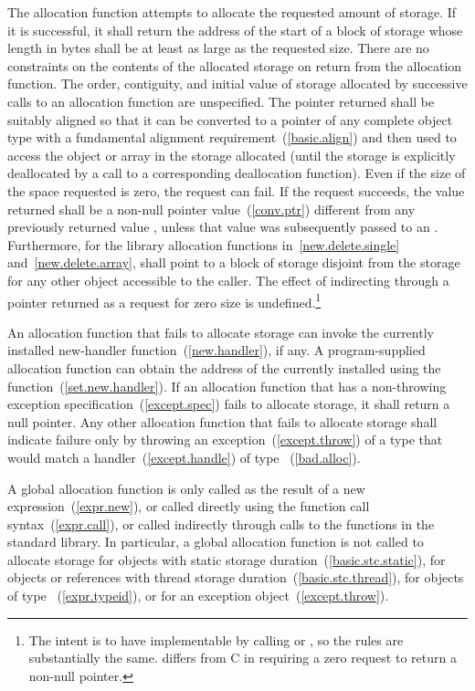 \pnum
The allocation function attempts to allocate the requested amount of
storage. If it is successful, it shall return the address of the start
of a block of storage whose length in bytes shall be at least as large
as the requested size. There are no constraints on the contents of the
allocated storage on return from the allocation function. The order,
contiguity, and initial value of storage allocated by successive calls
to an allocation function are unspecified. The pointer returned shall be
suitably aligned so that it can be converted to a pointer of any
complete object type with a fundamental alignment requirement~(\ref{basic.align})
and then used to access the object or array in the
storage allocated (until the storage is explicitly deallocated by a call
to a corresponding deallocation function). Even if the size of the space
requested is zero, the request can fail. If the request succeeds, the
value returned shall be a non-null pointer value~(\ref{conv.ptr})
 different from any previously returned value ,
unless that value  was subsequently passed to an
 .
Furthermore, for the library allocation functions
in~\ref{new.delete.single} and~\ref{new.delete.array},
 shall point to a block of storage disjoint from the storage
for any other object accessible to the caller.
The effect of indirecting through a pointer
returned as a request for zero size is undefined.\footnote{The intent is
to have  implementable by
calling  or , so the rules are
substantially the same. \Cpp differs from C in requiring a zero request
to return a non-null pointer.}

\pnum
An allocation function that fails to allocate storage can invoke the
currently installed new-handler function~(\ref{new.handler}), if any.
\enternote
{}%
A program-supplied allocation function can obtain the address of the
currently installed  using the
 function~(\ref{set.new.handler}). \exitnote
If an allocation function that has a non-throwing
exception specification~(\ref{except.spec})
fails to allocate storage, it shall return a null pointer. Any other
allocation function that fails to allocate storage shall indicate
failure only by throwing an exception~(\ref{except.throw}) of a type
that would match a handler~(\ref{except.handle}) of type
~(\ref{bad.alloc}).

\pnum
A global allocation function is only called as the result of a new
expression~(\ref{expr.new}), or called directly using the function call
syntax~(\ref{expr.call}), or called indirectly through calls to the
functions in the \Cpp standard library. \enternote In particular, a
global allocation function is not called to allocate storage for objects
with static storage duration~(\ref{basic.stc.static}), for objects or references
with thread storage duration~(\ref{basic.stc.thread}), for objects of
type ~(\ref{expr.typeid}), or for an
exception object~(\ref{except.throw}).
\exitnote

